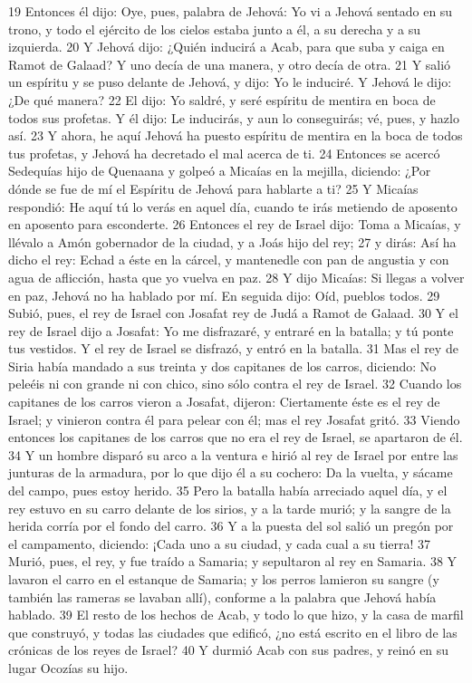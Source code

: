 19 Entonces él dijo: Oye, pues, palabra de Jehová: Yo vi a Jehová sentado en su trono, y todo el ejército de los cielos estaba junto a él, a su derecha y a su izquierda.
20 Y Jehová dijo: ¿Quién inducirá a Acab, para que suba y caiga en Ramot de Galaad? Y uno decía de una manera, y otro decía de otra.
21 Y salió un espíritu y se puso delante de Jehová, y dijo: Yo le induciré. Y Jehová le dijo: ¿De qué manera?
22 El dijo: Yo saldré, y seré espíritu de mentira en boca de todos sus profetas. Y él dijo: Le inducirás, y aun lo conseguirás; vé, pues, y hazlo así.
23 Y ahora, he aquí Jehová ha puesto espíritu de mentira en la boca de todos tus profetas, y Jehová ha decretado el mal acerca de ti.
24 Entonces se acercó Sedequías hijo de Quenaana y golpeó a Micaías en la mejilla, diciendo: ¿Por dónde se fue de mí el Espíritu de Jehová para hablarte a ti?
25 Y Micaías respondió: He aquí tú lo verás en aquel día, cuando te irás metiendo de aposento en aposento para esconderte.
26 Entonces el rey de Israel dijo: Toma a Micaías, y llévalo a Amón gobernador de la ciudad, y a Joás hijo del rey;
27 y dirás: Así ha dicho el rey: Echad a éste en la cárcel, y mantenedle con pan de angustia y con agua de aflicción, hasta que yo vuelva en paz.
28 Y dijo Micaías: Si llegas a volver en paz, Jehová no ha hablado por mí. En seguida dijo: Oíd, pueblos todos.
29 Subió, pues, el rey de Israel con Josafat rey de Judá a Ramot de Galaad.
30 Y el rey de Israel dijo a Josafat: Yo me disfrazaré, y entraré en la batalla; y tú ponte tus vestidos. Y el rey de Israel se disfrazó, y entró en la batalla.
31 Mas el rey de Siria había mandado a sus treinta y dos capitanes de los carros, diciendo: No peleéis ni con grande ni con chico, sino sólo contra el rey de Israel.
32 Cuando los capitanes de los carros vieron a Josafat, dijeron: Ciertamente éste es el rey de Israel; y vinieron contra él para pelear con él; mas el rey Josafat gritó.
33 Viendo entonces los capitanes de los carros que no era el rey de Israel, se apartaron de él.
34 Y un hombre disparó su arco a la ventura e hirió al rey de Israel por entre las junturas de la armadura, por lo que dijo él a su cochero: Da la vuelta, y sácame del campo, pues estoy herido.
35 Pero la batalla había arreciado aquel día, y el rey estuvo en su carro delante de los sirios, y a la tarde murió; y la sangre de la herida corría por el fondo del carro.
36 Y a la puesta del sol salió un pregón por el campamento, diciendo: ¡Cada uno a su ciudad, y cada cual a su tierra!
37 Murió, pues, el rey, y fue traído a Samaria; y sepultaron al rey en Samaria.
38 Y lavaron el carro en el estanque de Samaria; y los perros lamieron su sangre (y también las rameras se lavaban allí), conforme a la palabra que Jehová había hablado.
39 El resto de los hechos de Acab, y todo lo que hizo, y la casa de marfil que construyó, y todas las ciudades que edificó, ¿no está escrito en el libro de las crónicas de los reyes de Israel?
40 Y durmió Acab con sus padres, y reinó en su lugar Ocozías su hijo.
